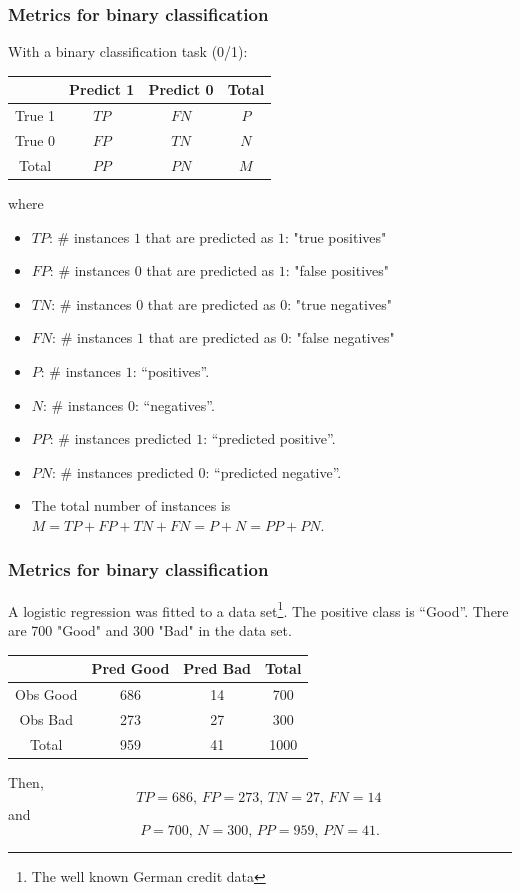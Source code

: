 \begin{frame}
\frametitle{Metrics for binary classification}
With a binary classification task (0/1):
\begin{center}
\begin{tabular}{|c|c|c||c|}
\hline
& Predict 1 & Predict 0 & Total \\
\hline
True 1 & $TP$ & $FN$ & $P$\\
\hline
True 0 & $FP$ & $TN$ & $N$ \\
\hline
\hline
Total & $PP$ & $PN$ & $M$\\
\hline
\end{tabular}
\end{center}
where\\
\scriptsize
\begin{itemize}
\item $TP$: $\#$ instances $1$ that are predicted as $1$: "true positives"
\item $FP$: $\#$ instances $0$ that are predicted as $1$: "false positives"
\item $TN$: $\#$ instances $0$ that are predicted as $0$: "true negatives"
\item $FN$: $\#$ instances $1$ that are predicted as $0$: "false negatives"
\item $P$: $\#$ instances $1$: ``positives''.
\item $N$: $\#$ instances $0$: ``negatives''.
\item $PP$: $\#$ instances predicted $1$: ``predicted positive''.
\item $PN$: $\#$ instances predicted $0$: ``predicted negative''.
\item The total number of instances is $M=TP+FP+TN+FN=P+N=PP+PN$.
\end{itemize}
\end{frame}
\begin{frame}[fragile]
\frametitle{Metrics for binary classification}
A logistic regression was fitted to a data set\footnote{The well known German credit data}. The positive class is ``Good''. There are 700 "Good" and 300 "Bad" in the data set.
\begin{center}
\begin{tabular}{c|c|c||c}
& Pred Good & Pred Bad & Total\\
\hline
Obs Good  & 686 & 14 & 700\\
\hline
Obs Bad   & 273 & 27 & 300\\
\hline\hline
 Total & 959 & 41 & 1000
\end{tabular}
\end{center}
Then,
$$
TP=686, \, FP=273, \, TN=27, \, FN=14\, 
$$
and
$$
P=700, \, N=300, \, PP=959, \, PN=41.
$$
\end{frame}
